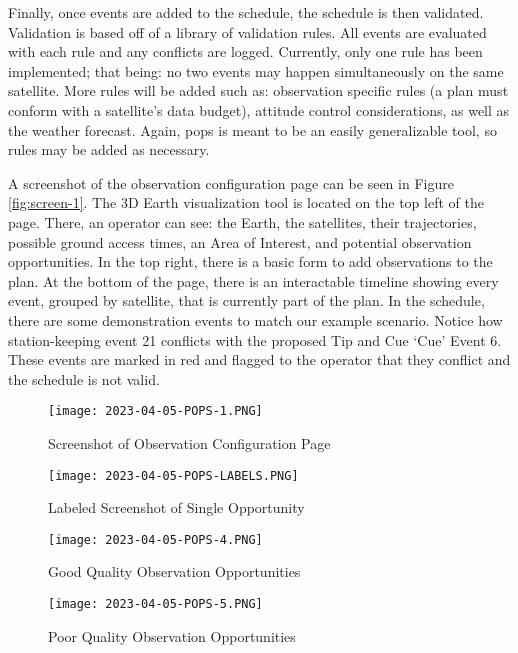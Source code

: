 Finally, once events are added to the schedule, the schedule is then validated.
Validation is based off of a library of validation rules. All events are
evaluated with each rule and any conflicts are logged. Currently, only one rule
has been implemented; that being: no two events may happen simultaneously on
the same satellite. More rules will be added such as: observation specific
rules (a plan must conform with a satellite’s data budget), attitude control
considerations, as well as the weather forecast. Again, \gls{pops} is meant to
be an easily generalizable tool, so rules may be added as necessary.

A screenshot of the observation configuration page can be seen in Figure
\ref{fig:screen-1}. The 3D Earth visualization tool is located on the top left
of the page.  There, an operator can see: the Earth, the satellites, their
trajectories, possible ground access times, an Area of Interest, and potential
observation opportunities. In the top right, there is a basic form to add
observations to the plan. At the bottom of the page, there is an interactable
timeline showing every event, grouped by satellite, that is currently part of
the plan. In the schedule, there are some demonstration events to match our
example scenario.  Notice how station-keeping event 21 conflicts with the
proposed Tip and Cue ‘Cue’ Event 6. These events are marked in red and flagged
to the operator that they conflict and the schedule is not valid.

\begin{figure}[h] 
    \centering
    \texttt{[image: 2023-04-05-POPS-1.PNG]} 
    \caption{Screenshot of Observation Configuration Page}
    \label{fig:screen-1} 

    \texttt{[image: 2023-04-05-POPS-LABELS.PNG]} 
    \caption{Labeled Screenshot of Single Opportunity}
    \label{fig:screen-2} 
\end{figure}

\begin{figure}[h] 
    \centering
    \texttt{[image: 2023-04-05-POPS-4.PNG]} 
    \caption{Good Quality Observation Opportunities}
    \label{fig:screen-3} 

    \texttt{[image: 2023-04-05-POPS-5.PNG]} 
    \caption{Poor Quality Observation Opportunities}
    \label{fig:screen-4} 
\end{figure}


